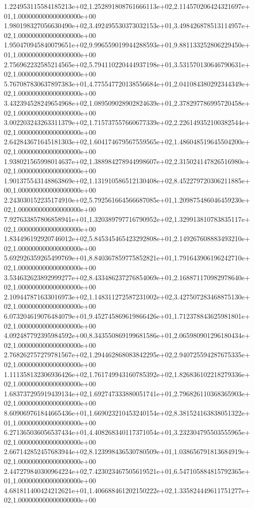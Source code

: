 1.224953115584185213e+02,1.252891808761666113e+02,2.114570206424321697e+01,1.000000000000000000e+00
1.980198327056630490e+02,3.492495530373032153e+01,3.498426878513114957e+02,1.000000000000000000e+00
1.950470945840079651e+02,9.996559019944288593e+01,9.881133252806229450e+01,1.000000000000000000e+00
2.756962232585214565e+02,5.794110220444937198e+01,3.531570130646790631e+02,1.000000000000000000e+00
5.767087830637897383e+01,4.775547720138556684e+01,2.041084380292344349e+02,1.000000000000000000e+00
3.432394528249654968e+02,1.089509028902824639e+01,2.378297786995720458e+02,1.000000000000000000e+00
3.002203243263311379e+02,1.715737557660677339e+02,2.226149352100382544e+02,1.000000000000000000e+00
2.642843671645181303e+02,1.604174679567559565e+02,1.486048519645504200e+02,1.000000000000000000e+00
1.938021565998014637e+02,1.388984278944998607e+02,2.315024147826516980e+02,1.000000000000000000e+00
1.901375543148863869e+02,1.131910586512130408e+02,8.452279720306211885e+00,1.000000000000000000e+00
2.243030152235174910e+02,5.792561664566687085e+01,1.209875486046459230e+02,1.000000000000000000e+00
7.927633857806858941e+01,1.320389797716790952e+02,1.329913810783835117e+02,1.000000000000000000e+00
1.834496192920746012e+02,5.845345465423292808e+01,2.149267608883493210e+02,1.000000000000000000e+00
5.692926359265499769e+01,8.840367859775852821e+01,1.791643906196242710e+02,1.000000000000000000e+00
3.534632623892999277e+02,8.433486237276854069e+01,2.168871170982978640e+02,1.000000000000000000e+00
2.109447871633016973e+02,1.148311272587231002e+02,3.427507283468875130e+02,1.000000000000000000e+00
6.073204619076484079e+01,9.452745869619866426e+01,1.712378843625981801e+02,1.000000000000000000e+00
4.092487792395984592e+00,8.343550869199681586e+01,2.065980901296180434e+02,1.000000000000000000e+00
2.768262757279781567e+02,1.294462868083842295e+02,2.940725594287675335e+02,1.000000000000000000e+00
1.111358132306936426e+02,1.761749943160785392e+02,1.826836102218279336e+02,1.000000000000000000e+00
1.683737295919439134e+02,1.692747333880051741e+01,2.796826110368365903e+02,1.000000000000000000e+00
8.609069761844665436e+01,1.669023210453240154e+02,8.381524163838051322e+01,1.000000000000000000e+00
6.271365036056537434e+01,4.408268340117371054e+01,3.232304795503555965e+02,1.000000000000000000e+00
2.667142852457683944e+02,8.123998436530780509e+01,1.038656791813684919e+02,1.000000000000000000e+00
2.447279840300964224e+02,7.423023467505619521e+01,6.547105884815792365e+01,1.000000000000000000e+00
4.681811400424212621e+01,1.406688461202150222e+02,1.335824449611751277e+02,1.000000000000000000e+00
